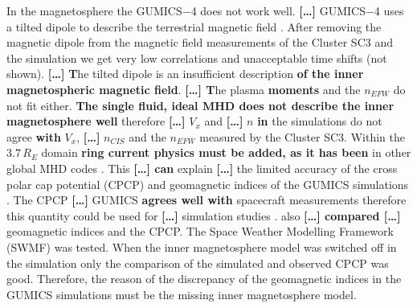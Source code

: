 \documentclass[linenumbers,draft]{agujournal}
\begin{document}
In the magnetosphere the GUMICS$-$4 does not work well. \textbf{[\dots]} GUMICS$-$4 uses a tilted dipole to describe the terrestrial magnetic field \citep{janhunen12:_gumic_mhd}. After removing the magnetic dipole from the magnetic field measurements of the Cluster SC3 and the simulation we get very low correlations and unacceptable time shifts (not shown). \textbf{[\dots]} \textbf{T}he tilted dipole is an insufficient description \textbf{of the inner magnetospheric magnetic field}. \textbf{[\dots] T}he plasma \textbf{moments} and the $n_{EFW}$ do not fit either. \textbf{The single fluid, ideal MHD does not describe the inner magnetosphere well} therefore \textbf{[\dots]} $V_{x}$ and \textbf{[\dots]} $n$ \textbf{in} the simulations do not agree \textbf{with} $V_{x}$, \textbf{[\dots]} $n_{CIS}$ and the $n_{EFW}$ measured by the Cluster SC3. Within the $3.7\,R_{E}$ domain \textbf{ring current physics must be added, as it has been} in other global MHD codes \textbf{\citep[for example][]{toth12:_adapt}}. This \textbf{\textbf{[\dots]} can} explain \textbf{[\dots]} the limited accuracy of the cross polar cap potential (CPCP) and  geomagnetic indices of the GUMICS simulations \citep{juusola14:_statis_gumic_mhd}. The CPCP \textbf{[\dots]} GUMICS \textbf{agrees well with} spacecraft measurements therefore this quantity could be used for \textbf{[\dots]} simulation studies \citep{lakka18:_cross_polar_cap_satur_gumic}. \citet{haiducek17:_swmf_global_magnet_simul_januar} also \textbf{[\dots] compared [\dots]} geomagnetic indices and the CPCP. The Space Weather Modelling Framework (SWMF) was tested. When the inner magnetosphere model was switched off in the simulation only the comparison of the simulated and observed CPCP was good. Therefore, the reason of the discrepancy of the geomagnetic indices in the GUMICS simulations must be the missing inner magnetosphere model.

\bf %
\end{document}
